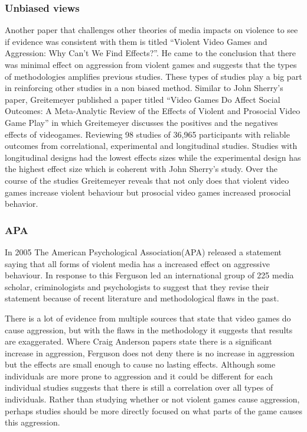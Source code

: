 \documentclass[journal]{IEEEtran}
\begin{document}
    \subsubsection{Unbiased views}
        Another paper that challenges other theories of media impacts on violence to see if evidence was consistent with them is titled “Violent Video Games and Aggression: Why Can't We Find Effects?”\cite{Sherry}. He came to the conclusion that there was minimal effect on aggression from violent games and suggests that the types of methodologies amplifies previous studies. These types of studies play a big part in reinforcing other studies in a non biased method.  Similar to John Sherry’s paper, Greitemeyer published a paper titled “Video Games Do Affect Social Outcomes: A Meta-Analytic Review of the Effects of Violent and Prosocial Video Game Play”\cite{Greitemeyer} in which Greitemeyer discusses the positives and the negatives effects of videogames. Reviewing 98 studies of 36,965 participants with reliable outcomes from correlational, experimental and longitudinal studies. Studies with longitudinal designs had the lowest effects sizes while the experimental design has the highest effect size which is coherent with John Sherry’s study. Over the course of the studies Greitemeyer reveals that not only does that violent video games increase violent behaviour but prosocial video games increased prosocial behavior.
    \subsubsection{APA}
        In 2005 The American Psychological Association(APA) released a statement saying that all forms of violent media has a increased effect on aggressive behaviour\cite{APA}. In response to this Ferguson led an international group of 225 media scholar, criminologists and psychologists to suggest that they revise their statement because of recent literature and methodological flaws in the past\cite{APALetter}. 

There is a lot of evidence from multiple sources that state that video games do cause aggression, but with the flaws in the methodology it suggests that results are exaggerated. Where Craig Anderson papers state there is a significant increase in aggression, Ferguson does not deny there is no increase in aggression but the effects are small enough to cause no lasting effects. Although some individuals are more prone to aggression and it could be different for each individual studies suggests that there is still a correlation over all types of individuals. Rather than studying whether or not violent games cause aggression, perhaps studies should be more directly focused on what parts of the game causes this aggression.
\end{document}
